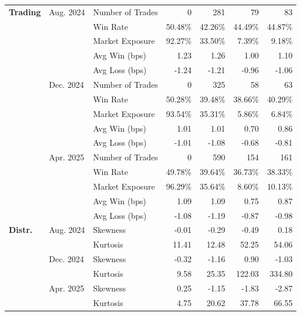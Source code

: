 \begin{table}[H]
{\begin{tabular*}{\textwidth}{@{\extracolsep{\fill}} l l l r r r r}
\textbf{Trading}
& Aug. 2024 & Number of Trades          & 0        & 281        & 79       & 83 \\
&           & Win Rate                  & 50.48\%  & 42.26\%    & 44.49\%  & 44.87\% \\
&           & Market Exposure           & 92.27\%  & 33.50\%    & 7.39\%   & 9.18\% \\
&           & Avg Win (bps)             & 1.23     & 1.26       & 1.00     & 1.10 \\
&           & Avg Loss (bps)            & -1.24    & -1.21      & -0.96    & -1.06 \\
& Dec. 2024 & Number of Trades          & 0        & 325        & 58       & 63 \\
&           & Win Rate                  & 50.28\%  & 39.48\%    & 38.66\%  & 40.29\% \\
&           & Market Exposure           & 93.54\%  & 35.31\%    & 5.86\%   & 6.84\% \\
&           & Avg Win (bps)             & 1.01     & 1.01       & 0.70     & 0.86 \\
&           & Avg Loss (bps)            & -1.01    & -1.08      & -0.68    & -0.81 \\
& Apr. 2025 & Number of Trades          & 0        & 590        & 154       & 161 \\
&           & Win Rate                  & 49.78\%  & 39.64\%    & 36.73\%   & 38.33\% \\
&           & Market Exposure           & 96.29\%  & 35.64\%    & 8.60\%    & 10.13\% \\
&           & Avg Win (bps)             & 1.09     & 1.09       & 0.75      & 0.87 \\
&           & Avg Loss (bps)            & -1.08    & -1.19      & -0.87     & -0.98 \\
\midrule

\textbf{Distr.}
& Aug. 2024 & Skewness                  & -0.01    & -0.29      & -0.49    & 0.18 \\
&           & Kurtosis                  & 11.41    & 12.48      & 52.25    & 54.06 \\
& Dec. 2024 & Skewness                  & -0.32    & -1.16      & 0.90     & -1.03 \\
&           & Kurtosis                  & 9.58     & 25.35      & 122.03   & 334.80 \\
& Apr. 2025 & Skewness                  & 0.25     & -1.15      & -1.83     & -2.87 \\
&           & Kurtosis                  & 4.75     & 20.62      & 37.78     & 66.55 \\


\end{tabular*}}
\end{table}
